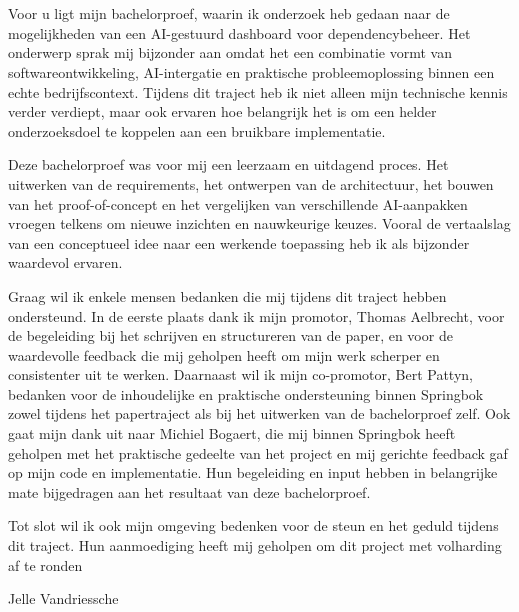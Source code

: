 
\chapter*{}%
\label{ch:voorwoord}


Voor u ligt mijn bachelorproef, waarin ik onderzoek heb gedaan naar de mogelijkheden van een AI-gestuurd dashboard voor dependencybeheer. Het onderwerp sprak mij bijzonder aan omdat het een combinatie vormt van softwareontwikkeling, AI-intergatie en praktische probleemoplossing binnen een echte bedrijfscontext. Tijdens dit traject heb ik niet alleen mijn technische kennis verder verdiept, maar ook ervaren hoe belangrijk het is om een helder onderzoeksdoel te koppelen aan een bruikbare implementatie.

Deze bachelorproef was voor mij een leerzaam en uitdagend proces. Het uitwerken van de requirements, het ontwerpen van de architectuur, het bouwen van het proof-of-concept en het vergelijken van verschillende AI-aanpakken vroegen telkens om nieuwe inzichten en nauwkeurige keuzes. Vooral de vertaalslag van een conceptueel idee naar een werkende toepassing heb ik als bijzonder waardevol ervaren.

Graag wil ik enkele mensen bedanken die mij tijdens dit traject hebben ondersteund. In de eerste plaats dank ik mijn promotor, Thomas Aelbrecht, voor de begeleiding bij het schrijven en structureren van de paper, en voor de waardevolle feedback die mij geholpen heeft om mijn werk scherper en consistenter uit te werken. Daarnaast wil ik mijn co-promotor, Bert Pattyn, bedanken voor de inhoudelijke en praktische ondersteuning binnen Springbok zowel tijdens het papertraject als bij het uitwerken van de bachelorproef zelf. Ook gaat mijn dank uit naar Michiel Bogaert, die mij binnen Springbok heeft geholpen met het praktische gedeelte van het project en mij gerichte feedback gaf op mijn code en implementatie. Hun begeleiding en input hebben in belangrijke mate bijgedragen aan het resultaat van deze bachelorproef.

Tot slot wil ik ook mijn omgeving bedenken voor de steun en het geduld tijdens dit traject. Hun aanmoediging heeft mij geholpen om dit project met volharding af te ronden

\bigskip

\noindent
Jelle Vandriessche

